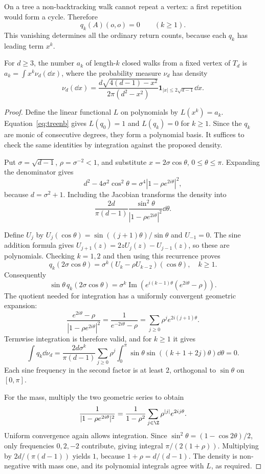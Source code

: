On a tree a non-backtracking walk cannot repeat a vertex: a first repetition would form a cycle. Therefore
\begin{equation}\label{eq:treenb}
q_k(A)(o,o)=0\qquad(k\ge1).
\end{equation}
This vanishing determines all the ordinary return counts, because each $q_k$ has leading term $x^k$.

\begin{theorem}[Kesten, 1959]\label{thm:kestenmeasure}
For $d\ge3$, the number $a_k$ of length-$k$ closed walks from a fixed vertex of $T_d$ is
$a_k=\int x^k\nu_d(\dd x)$,
where the probability measure $\nu_d$ has density
\[
\nu_d(\dd x)=\frac{d\sqrt{4(d-1)-x^2}}{2\pi(d^2-x^2)}
\mathbf1_{|x|\le2\sqrt{d-1}}\dd x.
\]
\end{theorem}
\begin{proof}
Define the linear functional $L$ on polynomials by $L(x^k)=a_k$. Equation~\eqref{eq:treenb} gives $L(q_0)=1$ and $L(q_k)=0$ for $k\ge1$. Since the $q_k$ are monic of consecutive degrees, they form a polynomial basis. It suffices to check the same identities by integration against the proposed density.

Put $\sigma=\sqrt{d-1}$, $\rho=\sigma^{-2}<1$, and substitute $x=2\sigma\cos\theta$, $0\le\theta\le\pi$. Expanding the denominator gives
\[
d^2-4\sigma^2\cos^2\theta
=\sigma^4|1-\rho e^{2i\theta}|^2,
\]
because $d=\sigma^2+1$. Including the Jacobian transforms the density into
\[
\frac{2d}{\pi(d-1)}
\frac{\sin^2\theta}{|1-\rho e^{2i\theta}|^2}\dd\theta.
\]

Define $U_j$ by $U_j(\cos\theta)=\sin((j+1)\theta)/\sin\theta$ and $U_{-1}=0$. The sine addition formula gives $U_{j+1}(z)=2zU_j(z)-U_{j-1}(z)$, so these are polynomials. Checking $k=1,2$ and then using this recurrence proves
\[
q_k(2\sigma\cos\theta)=\sigma^k(U_k-\rho U_{k-2})(\cos\theta),\quad k\ge1.
\]
Consequently
\[
\sin\theta\,q_k(2\sigma\cos\theta)
=\sigma^k\operatorname{Im}\left(e^{i(k-1)\theta}(e^{2i\theta}-\rho)\right).
\]
The quotient needed for integration has a uniformly convergent geometric expansion:
\[
\frac{e^{2i\theta}-\rho}{|1-\rho e^{2i\theta}|^2}
=\frac1{e^{-2i\theta}-\rho}
=\sum_{j\ge0}\rho^je^{2i(j+1)\theta}.
\]
Termwise integration is therefore valid, and for $k\ge1$ it gives
\[
\int q_k\dd\nu_d=
\frac{2d\sigma^k}{\pi(d-1)}
\sum_{j\ge0}\rho^j\int_0^\pi\sin\theta\sin((k+1+2j)\theta)\dd\theta=0.
\]
Each sine frequency in the second factor is at least $2$, orthogonal to $\sin\theta$ on $[0,\pi]$.

For the mass, multiply the two geometric series to obtain
\[
\frac1{|1-\rho e^{2i\theta}|^2}
=\frac1{1-\rho^2}\sum_{j\in\Z}\rho^{|j|}e^{2ij\theta}.
\]
Uniform convergence again allows integration. Since $\sin^2\theta=(1-\cos2\theta)/2$, only frequencies $0,2,-2$ contribute, giving integral $\pi/(2(1+\rho))$. Multiplying by $2d/(\pi(d-1))$ yields $1$, because $1+\rho=d/(d-1)$. The density is non-negative with mass one, and its polynomial integrals agree with $L$, as required.
\end{proof}

